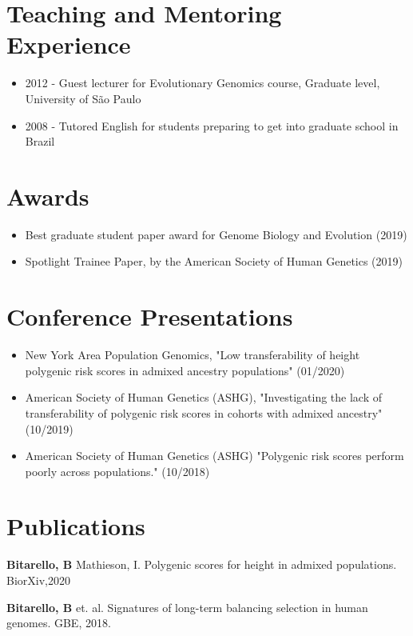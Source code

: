 \documentclass{article}
\begin{document}
\section{Teaching and Mentoring Experience }
\begin{itemize}
\item 2012 - Guest lecturer for Evolutionary Genomics course, Graduate level, University of São Paulo
\item 2008 - Tutored English for students preparing to get into graduate school in Brazil
\end{itemize}

\section{Awards}
\begin{itemize}
\item Best graduate student paper award for Genome Biology and Evolution (2019)
\item  Spotlight Trainee Paper, by the
American Society of Human Genetics (2019)
\end{itemize}

\section{Conference Presentations }

\begin{itemize}
\item  New York Area Population Genomics, "Low transferability of height polygenic risk scores in admixed ancestry populations" (01/2020)
\item American Society of Human Genetics (ASHG), "Investigating the lack of transferability of polygenic risk scores in cohorts with admixed ancestry" (10/2019)
\item American Society of Human Genetics (ASHG) "Polygenic risk scores perform poorly across populations." (10/2018)
\end{itemize}

 
\section{Publications}
\textbf{Bitarello, B} Mathieson, I. Polygenic scores for height in admixed populations. BiorXiv,2020

\textbf{Bitarello, B} et. al. Signatures of long-term balancing selection in human genomes.
GBE, 2018.
\end{document}
